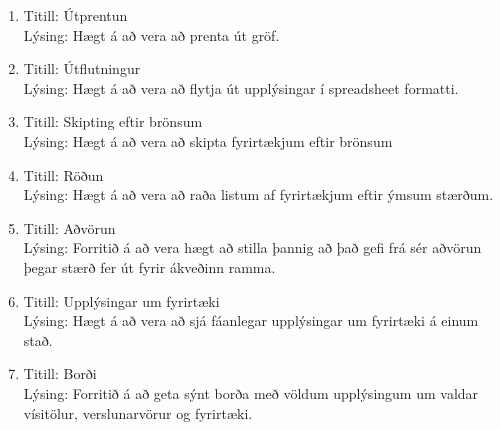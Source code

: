 \documentclass[a4,12pt]{article}
\newcommand{\eenum}{\end{enumerate}}
\begin{document}
\begin{enumerate}[]
\item Titill: Útprentun\\
Lýsing: Hægt á að vera að prenta út gröf.

\item Titill: Útflutningur\\
Lýsing: Hægt á að vera að flytja út upplýsingar í spreadsheet formatti.

\item Titill: Skipting eftir brönsum\\
Lýsing: Hægt á að vera að skipta fyrirtækjum eftir brönsum

\item Titill: Röðun\\
Lýsing: Hægt á að vera að raða listum af fyrirtækjum eftir ýmsum stærðum.

\item Titill: Aðvörun\\
Lýsing: Forritið á að vera hægt að stilla þannig að það gefi frá sér aðvörun þegar stærð fer út fyrir ákveðinn ramma.

\item Titill: Upplýsingar um fyrirtæki\\
Lýsing: Hægt á að vera að sjá fáanlegar upplýsingar um fyrirtæki á einum stað.

\item Titill: Borði\\
Lýsing: Forritið á að geta sýnt borða með völdum upplýsingum um valdar vísitölur, verslunarvörur og fyrirtæki.
\eenum
\end{document}
